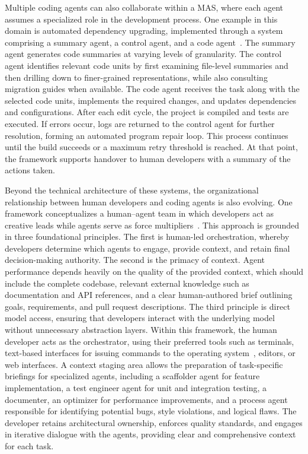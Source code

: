 \documentclass[
english,                 %
bibtex,                  %
includeExtraAbstracts, %
]{kththesis}
\numberwithin{listing}{chapter}
\begin{document}
Multiple coding agents can also collaborate within a \gls{MAS}, where each agent assumes a specialized role in the development process. One example in this domain is automated dependency upgrading, implemented through a system comprising a summary agent, a control agent, and a code agent~\cite{tawosi_llm_2025}. The summary agent generates code summaries at varying levels of granularity. The control agent identifies relevant code units by first examining file-level summaries and then drilling down to finer-grained representations, while also consulting migration guides when available. The code agent receives the task along with the selected code units, implements the required changes, and updates dependencies and configurations. After each edit cycle, the project is compiled and tests are executed. If errors occur, logs are returned to the control agent for further resolution, forming an automated program repair loop. This process continues until the build succeeds or a maximum retry threshold is reached. At that point, the framework supports handover to human developers with a summary of the actions taken.

Beyond the technical architecture of these systems, the organizational relationship between human developers and coding agents is also evolving. One framework conceptualizes a human–agent team in which developers act as creative leads while agents serve as force multipliers~\cite{gulli_coding_2025}. This approach is grounded in three foundational principles. The first is human-led orchestration, whereby developers determine which agents to engage, provide context, and retain final decision-making authority. The second is the primacy of context. Agent performance depends heavily on the quality of the provided context, which should include the complete codebase, relevant external knowledge such as documentation and \gls{API} references, and a clear human-authored brief outlining goals, requirements, and pull request descriptions. The third principle is direct model access, ensuring that developers interact with the underlying model without unnecessary abstraction layers. Within this framework, the human developer acts as the orchestrator, using their preferred tools such as terminals, text-based interfaces for issuing commands to the operating system~\cite{sutherland_sketchpad_1963}, editors, or web interfaces. A context staging area allows the preparation of task-specific briefings for specialized agents, including a scaffolder agent for feature implementation, a test engineer agent for unit and integration testing, a documenter, an optimizer for performance improvements, and a process agent responsible for identifying potential bugs, style violations, and logical flaws. The developer retains architectural ownership, enforces quality standards, and engages in iterative dialogue with the agents, providing clear and comprehensive context for each task.
\end{document}
